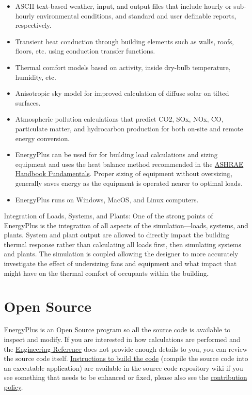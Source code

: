 \begin{itemize}
\item ASCII text-based weather, input, and output files that include hourly
or sub-hourly environmental conditions, and standard and user definable
reports, respectively. 
\item Transient heat conduction through building elements such as walls,
roofs, floors, etc. using conduction transfer functions.
\item Thermal comfort models based on activity, inside dry-bulb temperature,
humidity, etc.
\item Anisotropic sky model for improved calculation of diffuse solar on
tilted surfaces.
\item Atmospheric pollution calculations that predict CO2, SOx, NOx, CO,
particulate matter, and hydrocarbon production for both on-site and
remote energy conversion.
\item EnergyPlus can be used for for building load calculations and sizing
equipment and uses the heat balance method recommended in the \href{https://www.ashrae.org/technical-resources/ashrae-handbook}{ASHRAE Handbook Fundamentals}.
Proper sizing of equipment without oversizing, generally saves energy
as the equipment is operated nearer to optimal loads.
\item EnergyPlus runs on Windows, MacOS, and Linux computers. 
\end{itemize}
Integration of Loads, Systems, and Plants: One of the strong points
of EnergyPlus is the integration of all aspects of the simulation---loads,
systems, and plants. System and plant output are allowed to directly
impact the building thermal response rather than calculating all loads
first, then simulating systems and plants. The simulation is coupled
allowing the designer to more accurately investigate the effect of
undersizing fans and equipment and what impact that might have on
the thermal comfort of occupants within the building. 

\section{Open Source}

\href{https://energyplus.net/}{EnergyPlus} is an \href{https://opensource.org/}{Open Source}
program so all the \href{https://github.com/NREL/EnergyPlus}{source code}
is available to inspect and modify. If you are interested in how calculations
are performed and the \href{https://energyplus.net/documentation}{Engineering Reference}
does not provide enough details to you, you can review the source
code itself. \href{https://github.com/NREL/EnergyPlus/wiki/BuildingEnergyPlus}{Instructions to build the code}
(compile the source code into an executable application) are available
in the source code repository wiki if you see something that needs
to be enhanced or fixed, please also see the \href{https://energyplus.net/contributing}{contribution policy}. 

